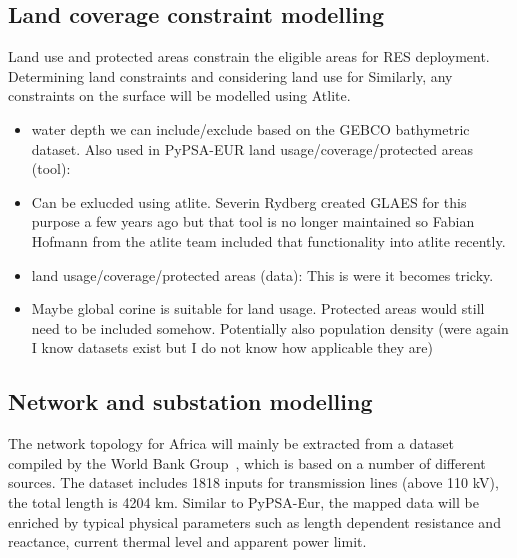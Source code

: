 \documentclass[conference, a4paper]{IEEEtran}
\begin{document}
\subsection{Land coverage constraint modelling}
Land use and protected areas constrain the eligible areas for RES deployment.
Determining land constraints and considering land use for Similarly, any constraints on the surface will be modelled using Atlite.
\begin{itemize}
\item water depth we can include/exclude based on the GEBCO bathymetric dataset. Also used in PyPSA-EUR
	land usage/coverage/protected areas (tool): 
\item Can be exlucded using atlite. Severin Rydberg created GLAES for this purpose a few years ago but that tool is no longer maintained so Fabian Hofmann from the atlite team included that functionality into atlite recently.
	
\item land usage/coverage/protected areas (data): This is were it becomes tricky.
\item  Maybe global corine is suitable for land usage. Protected areas would still need to be included somehow. Potentially also population density (were again I know datasets exist but I do not know how applicable they are)
\end{itemize}



\subsection{Network and substation modelling} 
The network topology for Africa will mainly be extracted from a dataset compiled by the World Bank Group~\cite{arderne-2017}, which is based on a number of different sources. The dataset includes 1818 inputs for transmission lines (above 110 kV), the total length is 4204 km. Similar to PyPSA-Eur\cite{PyPSAEur}, the mapped data will be enriched by typical physical parameters such as length dependent resistance and reactance, current thermal level and apparent power limit.
\end{document}
